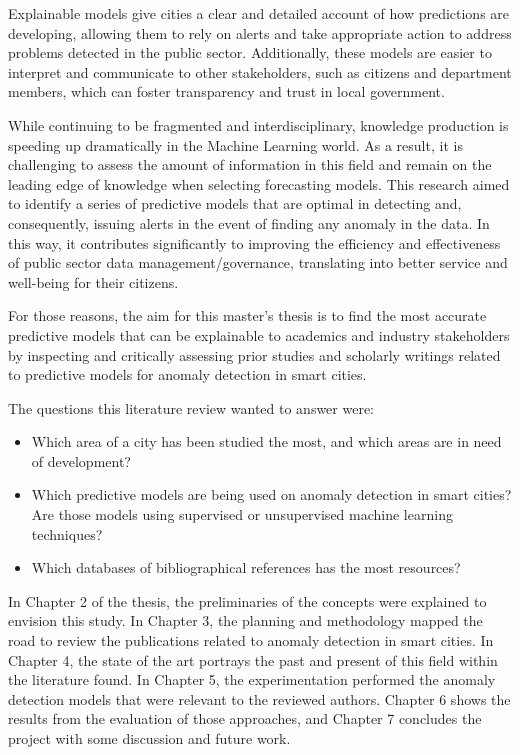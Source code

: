 \documentclass[a4paper,12pt,twoside]{ThesisStyle}
\begin{document}
Explainable models give cities a clear and detailed account of how predictions are developing, allowing them to rely on alerts and take appropriate action to address problems detected in the public sector. Additionally, these models are easier to interpret and communicate to other stakeholders, such as citizens and department members, which can foster transparency and trust in local government.

While continuing to be fragmented and interdisciplinary, knowledge production is speeding up dramatically in the Machine Learning world. As a result, it is challenging to assess the amount of information in this field and remain on the leading edge of knowledge when selecting forecasting models. This research aimed to identify a series of predictive models that are optimal in detecting and, consequently, issuing alerts in the event of finding any anomaly in the data. In this way, it contributes significantly to improving the efficiency and effectiveness of public sector data management/governance, translating into better service and well-being for their citizens.

For those reasons, the aim for this master's thesis is to find the most accurate predictive models that can be explainable to academics and industry stakeholders by inspecting and critically assessing prior studies and scholarly writings related to predictive models for anomaly detection in smart cities. 

The questions this literature review wanted to answer were:

\begin{itemize}
  \item Which area of a city has been studied the most, and which areas are in need of development?
  \item Which predictive models are being used on anomaly detection in smart cities? Are those models using supervised or unsupervised machine learning techniques?
  \item Which databases of bibliographical references has the most resources?
\end{itemize}

In Chapter 2 of the thesis, the preliminaries of the concepts were explained to envision this study. In Chapter 3, the planning and methodology mapped the road to review the publications related to anomaly detection in smart cities. In Chapter 4, the state of the art portrays the past and present of this field within the literature found. In Chapter 5, the experimentation performed the anomaly detection models that were relevant to the reviewed authors. Chapter 6 shows the results from the evaluation of those approaches, and Chapter 7 concludes the project with some discussion and future work.
\end{document}
